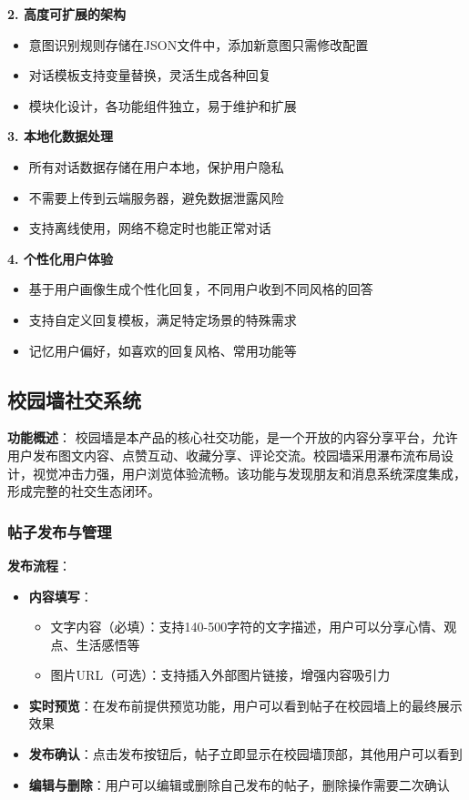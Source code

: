 \documentclass[12pt,a4paper]{article}
\begin{document}
\textbf{2. 高度可扩展的架构}
\begin{itemize}
    \item 意图识别规则存储在JSON文件中，添加新意图只需修改配置
    \item 对话模板支持变量替换，灵活生成各种回复
    \item 模块化设计，各功能组件独立，易于维护和扩展
\end{itemize}

\textbf{3. 本地化数据处理}
\begin{itemize}
    \item 所有对话数据存储在用户本地，保护用户隐私
    \item 不需要上传到云端服务器，避免数据泄露风险
    \item 支持离线使用，网络不稳定时也能正常对话
\end{itemize}

\textbf{4. 个性化用户体验}
\begin{itemize}
    \item 基于用户画像生成个性化回复，不同用户收到不同风格的回答
    \item 支持自定义回复模板，满足特定场景的特殊需求
    \item 记忆用户偏好，如喜欢的回复风格、常用功能等
\end{itemize}

\subsection{校园墙社交系统}

\textbf{功能概述}：
校园墙是本产品的核心社交功能，是一个开放的内容分享平台，允许用户发布图文内容、点赞互动、收藏分享、评论交流。校园墙采用瀑布流布局设计，视觉冲击力强，用户浏览体验流畅。该功能与发现朋友和消息系统深度集成，形成完整的社交生态闭环。

\subsubsection{帖子发布与管理}

\textbf{发布流程}：
\begin{itemize}
    \item \textbf{内容填写}：
        \begin{itemize}
            \item 文字内容（必填）：支持140-500字符的文字描述，用户可以分享心情、观点、生活感悟等
            \item 图片URL（可选）：支持插入外部图片链接，增强内容吸引力
        \end{itemize}
    \item \textbf{实时预览}：在发布前提供预览功能，用户可以看到帖子在校园墙上的最终展示效果
    \item \textbf{发布确认}：点击发布按钮后，帖子立即显示在校园墙顶部，其他用户可以看到
    \item \textbf{编辑与删除}：用户可以编辑或删除自己发布的帖子，删除操作需要二次确认
\end{itemize}
\end{document}

